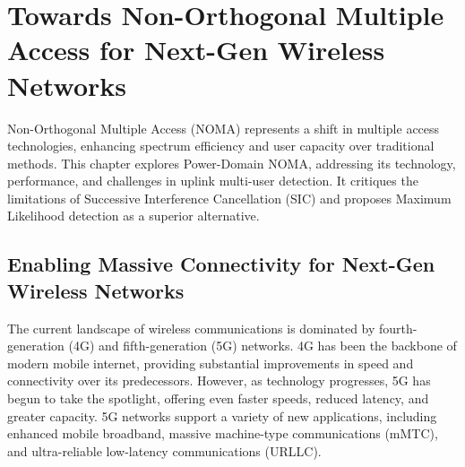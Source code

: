 
\chapter{Towards Non-Orthogonal Multiple Access for Next-Gen Wireless Networks} \label{Chapter:noma}

\ifpdf
    \graphicspath{{Chapter2/Figs/Raster/}{Chapter2/Figs/PDF/}{Chapter2/Figs/}}
\else
    \graphicspath{{Chapter2/Figs/Vector/}{Chapter2/Figs/}}
\fi

Non-Orthogonal Multiple Access (NOMA) represents a shift in multiple access technologies, enhancing spectrum efficiency and user capacity over traditional methods. This chapter explores Power-Domain NOMA, addressing its technology, performance, and challenges in uplink multi-user detection. It critiques the limitations of Successive Interference Cancellation (SIC) and proposes Maximum Likelihood detection as a superior alternative.

\section{Enabling Massive Connectivity for Next-Gen Wireless Networks}\label{section}


The current landscape of wireless communications is dominated by fourth-generation (4G) and fifth-generation (5G) networks. 4G has been the backbone of modern mobile internet, providing substantial improvements in speed and connectivity over its predecessors. However, as technology progresses, 5G has begun to take the spotlight, offering even faster speeds, reduced latency, and greater capacity. 5G networks support a variety of new applications, including enhanced mobile broadband, massive machine-type communications (mMTC), and ultra-reliable low-latency communications (URLLC).

